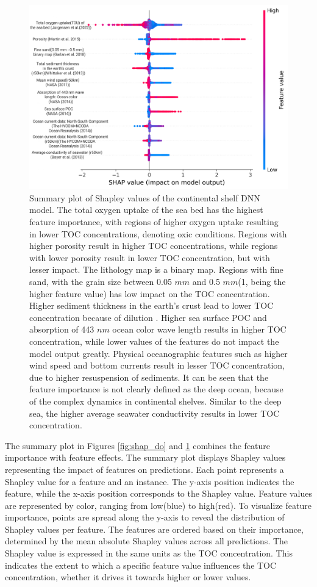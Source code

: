 \documentclass[journal abbreviation, manuscript]{copernicus}
\begin{document}
\begin{figure}[!htb]
\includegraphics[width=12cm]{figures/f09.png}
\caption{Summary plot of Shapley values of the continental shelf DNN model. The total oxygen uptake \citep{TOU_JORGENSEN2022} of the sea bed has the highest feature importance, with regions of higher oxygen uptake resulting in lower TOC concentrations, denoting oxic conditions. Regions with higher porosity \citep{Martin2005Porosity} result in higher TOC concentrations, while regions with lower porosity result in lower TOC concentration, but with lesser impact. The lithology map is a binary map. Regions with fine sand, with the grain size between 0.05 $mm$ and 0.5 $mm$(1, being the higher feature value) has low impact on the TOC concentration. Higher sediment thickness in the earth's crust lead to lower TOC concentration because of dilution \citep{Berner1982}. Higher sea surface POC and absorption of 443 $nm$ ocean color wave length results in higher TOC concentration, while lower values of the features do not impact the model output greatly. Physical oceanographic features such as higher wind speed and bottom currents result in lesser TOC concentration, due to higher resuspension of sediments.   It can be seen that the feature importance is not clearly defined as the deep ocean, because of the complex dynamics in continental shelves. Similar to the deep sea, the higher average seawater conductivity results in lower TOC concentration. }
\label{fig:shap_cs}
\end{figure}


The summary plot in Figures \ref{fig:shap_do} and \ref{fig:shap_cs} combines the feature importance with feature effects. The summary plot displays Shapley values representing the impact of features on predictions. Each point represents a Shapley value for a feature and an instance. The y-axis position indicates the feature, while the x-axis position corresponds to the Shapley value. Feature values are represented by color, ranging from low(blue) to high(red). To visualize feature importance, points are spread along the y-axis to reveal the distribution of Shapley values per feature. The features are ordered based on their importance, determined by the mean absolute Shapley values across all predictions. The Shapley value is expressed in the same units as the TOC concentration. This indicates the extent to which a specific feature value influences the TOC concentration, whether it drives it towards higher or lower values.
\end{document}
